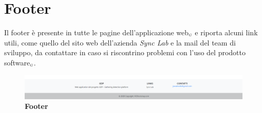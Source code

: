\section{Footer}\label{UtilizzoDiGDPGatheringDetecionPlatformFooter}
Il footer è presente in tutte le pagine dell'applicazione web$_{\scaleto{G}{3pt}}$ e riporta alcuni link utili, come quello del sito web dell'azienda \textit{Sync Lab} e la mail del team di sviluppo, da contattare in caso si riscontrino problemi con l'uso del prodotto software$_{\scaleto{G}{3pt}}$. 
\begin{center}
	\begin{figure}[H]
		\centering\includegraphics[width=1\linewidth]{../immagini/manualeUtente/Footer.png}
		\caption{\textbf{Footer}}
	\end{figure}
\end{center}